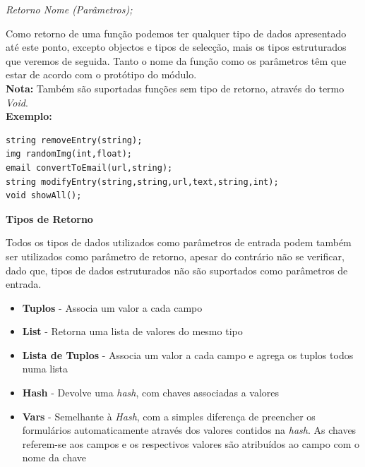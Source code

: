 \documentclass[a4paper]{article}
\begin{document}
\begin{center}
\emph{Retorno Nome (Parâmetros);}
\end{center}

Como retorno de uma função podemos ter qualquer tipo de dados apresentado até este ponto, excepto objectos e tipos de selecção, mais
os tipos estruturados que veremos de seguida. Tanto o nome da função como os parâmetros têm que estar de acordo com o protótipo do
módulo.\\

\textbf{Nota:} Também são suportadas funções sem tipo de retorno, através do termo \emph{Void}.\\

\textbf{Exemplo:}

\begin{small}
\begin{lstlisting}
string removeEntry(string);
img randomImg(int,float);
email convertToEmail(url,string);
string modifyEntry(string,string,url,text,string,int);
void showAll();
\end{lstlisting}
\end{small}

\vspace{.2cm}

\begin{normalsize}
\textbf{Tipos de Retorno}\\
\end{normalsize}

\hspace{1cm}Todos os tipos de dados utilizados como parâmetros de entrada podem também ser utilizados como parâmetro de retorno, apesar
do contrário não se verificar, dado que, tipos de dados estruturados não são suportados como parâmetros de entrada.\\

\begin{itemize}
        \item \textbf{Tuplos} - Associa um valor a cada campo 
        \item \textbf{List} - Retorna uma lista de valores do mesmo tipo
        \item \textbf{Lista de Tuplos} - Associa um valor a cada campo e agrega os tuplos todos numa lista
        \item \textbf{Hash} - Devolve uma \emph{hash}, com chaves associadas a valores
        \item \textbf{Vars} - Semelhante à \emph{Hash}, com a simples diferença de preencher os formulários automaticamente através dos
        valores contidos na \emph{hash}. As chaves referem-se aos campos e os respectivos valores são atribuídos ao campo com o nome da
        chave\\
\end{itemize}
\end{document}
